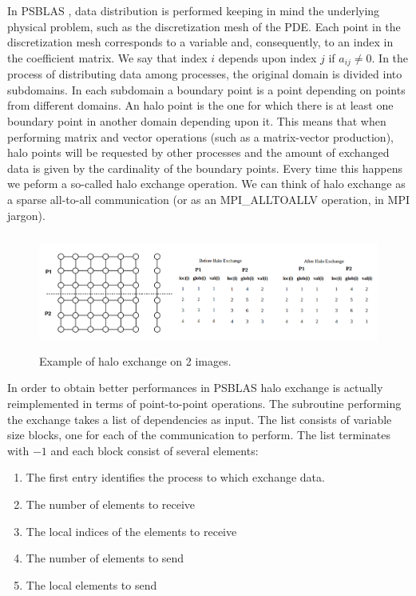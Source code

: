 \documentclass{IOS-Book-Article}
\begin{document}
In PSBLAS \cite{r1}, data distribution is performed keeping in mind the underlying physical problem, such as the discretization mesh of the PDE. 
Each point in the discretization mesh corresponds to a variable and, consequently, to an index in the coefficient matrix. We say that index $i$ depends upon index $j$ if $a_{ij}\neq0$. 
In the process of distributing data among processes, the original domain is divided into subdomains. 
In each subdomain a boundary point is a point depending on points from different domains. An halo point is the one for which there is at least one boundary point in another domain depending upon it. 
This means that when performing matrix and vector operations (such as a matrix-vector production), halo points will be requested by other processes and the amount of exchanged data is given by the cardinality of the boundary points. 
Every time this happens we peform a so-called halo exchange operation. We can think of halo exchange as a sparse all-to-all communication (or as an MPI\_ALLTOALLV operation, in MPI jargon).
\begin{figure}
\includegraphics[height=1.5in, width=4.65in]{halo2.png}
\caption{Example of halo exchange on 2 images. }
\end{figure}
In order to obtain better performances in PSBLAS halo exchange is actually reimplemented in terms of point-to-point operations. 
The subroutine performing the exchange takes a list of dependencies as input. The list consists of variable size blocks, one for each of the communication to perform. The list terminates with $-1$ and each block consist of several elements:
\begin{enumerate}
\item The first entry identifies the process to which exchange data.
\item The number of elements to receive
\item The local indices of the elements to receive
\item The number of elements to send
\item The local elements to send
\end{enumerate}
\end{document}
